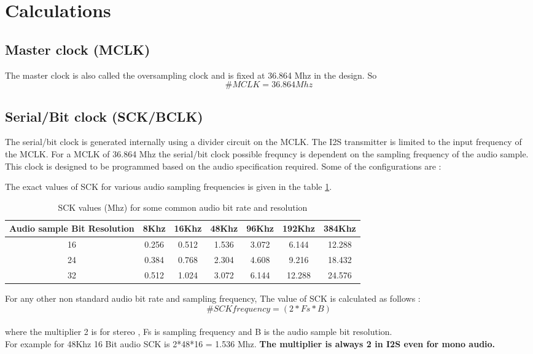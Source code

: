 \documentclass[12pt,a4paper]{report}
\begin{document}


\section{Calculations} 


\subsection{Master clock (MCLK)}
The master clock is also called the oversampling clock and is fixed at 36.864 Mhz in the design. So
 \[\textbf{\# }  MCLK = 36.864 Mhz \]

\subsection{Serial/Bit clock (SCK/BCLK)}
The serial/bit clock is generated internally using a divider circuit on the MCLK. The I2S transmitter is limited to the input frequency of the MCLK. For a MCLK of 36.864 Mhz the serial/bit clock possible frequncy is dependent on the sampling frequency of  the audio sample. This clock is designed to be programmed based on the audio specification required. Some of the configurations are :

The exact values of SCK for various audio sampling frequencies is given in the table \ref{tab:SCK}.
\begin{table} 
\begin{center}
\begin{tabular}{|c|c|c|c|c|c|c| } 
 \hline
Audio sample Bit Resolution  &  8Khz &  16Khz  &  48Khz  &  96Khz & 192Khz & 384Khz \\ 
\hline
16 &  0.256   &  0.512  &   1.536  & 3.072 &  6.144   & 12.288 \\
 \hline
24 &  0.384    & 0.768   &  2.304  &  4.608  & 9.216  &  18.432 \\
 \hline
32   & 0.512   &  1.024  &   3.072 &   6.144  &  12.288  & 24.576 \\
 \hline
\end{tabular}
\caption{\label{tab:SCK} SCK values (Mhz) for some common audio bit rate and resolution}
\end{center}
\end{table}

For any other non standard audio bit rate and sampling frequency, The value of SCK is calculated as follows :
\\
 \[\textbf{\# }  SCK frequency = (2*Fs*B )\]
\\
where the multiplier 2 is for stereo , Fs is sampling frequency and B is the audio sample bit resolution.
\\For example for 48Khz 16 Bit audio SCK is 2*48*16 = 1.536 Mhz.
\textbf{The multiplier is always 2 in I2S even for mono audio.}
\end{document}

